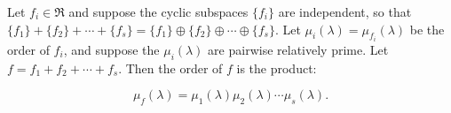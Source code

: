 Let $f_i \in \Re$ and suppose the cyclic subspaces $\{f_i\}$ are independent, so that $\{f_1\} + \{f_2\} + \cdots + \{f_s\} = \{f_1\} \oplus \{f_2\} \oplus \cdots \oplus \{f_s\}$. Let $\mu_i(\lambda) = \mu_{f_i}(\lambda)$ be the order of $f_i$, and suppose the $\mu_i(\lambda)$ are pairwise relatively prime. Let $f = f_1 + f_2 + \cdots + f_s$. Then the order of $f$ is the product:

$$\mu_f(\lambda) = \mu_1(\lambda)\mu_2(\lambda) \cdots \mu_s(\lambda).$$
